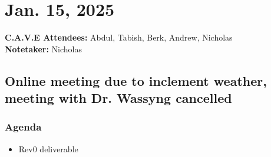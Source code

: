 	\pagebreak
	\section*{Jan. 15, 2025}

	\textbf{C.A.V.E Attendees:} Abdul, Tabish, Berk, Andrew, Nicholas\\
	\textbf{Notetaker:} Nicholas

	\subsection*{Online meeting due to inclement weather, meeting with Dr. Wassyng cancelled}
		\subsubsection*{Agenda}
			\begin{itemize}
				\item Rev0 deliverable
			\end{itemize}

